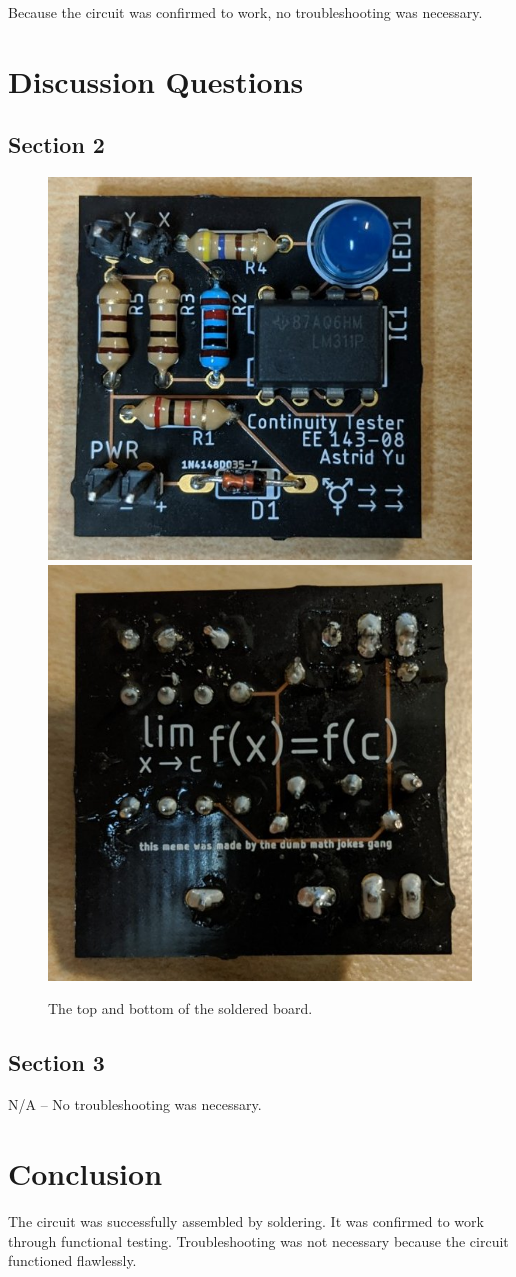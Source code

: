 \documentclass[12pt]{article}
\begin{document}
Because the circuit was confirmed to work, no troubleshooting was necessary. 

\section*{Discussion Questions}

\subsection*{Section 2}

\begin{figure}[H]
  \centering
  \includegraphics[width=0.45\linewidth]{img/top.jpg}
  \includegraphics[width=0.45\linewidth]{img/bot.jpg}
  \caption{The top and bottom of the soldered board.}
  \label{}
\end{figure}

\subsection*{Section 3}

N/A -- No troubleshooting was necessary.

\section*{Conclusion}

The circuit was successfully assembled by soldering. It was confirmed to work through functional testing. Troubleshooting was not necessary because the circuit functioned flawlessly. 
\end{document}
